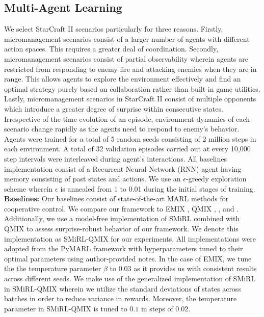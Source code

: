 \documentclass{article}
\begin{document}
\subsection{Multi-Agent Learning}
We select StarCraft II scenarios particularly for three reasons. Firstly, micromanagement scenarios consist of a larger number of agents with different action spaces. This requires a greater deal of coordination. Secondly, micromanagement scenarios consist of partial observability wherein agents are restricted from responding to enemy fire and attacking enemies when they are in range. This allows agents to explore the environment effectively and find an optimal strategy purely based on collaboration rather than built-in game utilities. Lastly, micromanagement scenarios in StarCraft II consist of multiple opponents which introduce a greater degree of surprise within consecutive states. Irrespective of the time evolution of an episode, environment dynamics of each scenario change rapidly as the agents need to respond to enemy's behavior. Agents were trained for a total of 5 random seeds consisting of 2 million steps in each environment. A total of 32 validation episodes carried out at every 10,000 step intervals were interleaved during agent's interactions. All baselines implementation consist of a Recurrent Neural Network (RNN) agent having memory consisting of past states and actions. We use an $\epsilon$-greedy exploration scheme wherein $\epsilon$ is annealed from 1 to 0.01 during the initial stages of training.\\


\textbf{Baselines:} Our baselines consist of state-of-the-art MARL methods for cooperative control. We compare our framework to EMIX \cite{emix}, QMIX \cite{qmix}, \cite{vdn}, \cite{coma} and \cite{iql}. Additionally, we use a model-free implementation of SMiRL \cite{smirl} combined with QMIX to assess surprise-robust behavior of our framework. We denote this implementation as SMiRL-QMIX for our experiments. All implementations were adopted from the PyMARL \cite{smac} framework with hyperparameters tuned to their optimal parameters using author-provided notes. In the case of EMIX, we tune the the temperature parameter $\beta$ to $0.03$ as it provides us with consistent results across different seeds. We make use of the generalized implementation of SMiRL \cite{gen} in SMiRL-QMIX wherein we utilize the standard deviations of states across batches in order to reduce variance in rewards. Moreover, the temperature parameter in SMiRL-QMIX is tuned to $0.1$ in steps of $0.02$.
\end{document}
